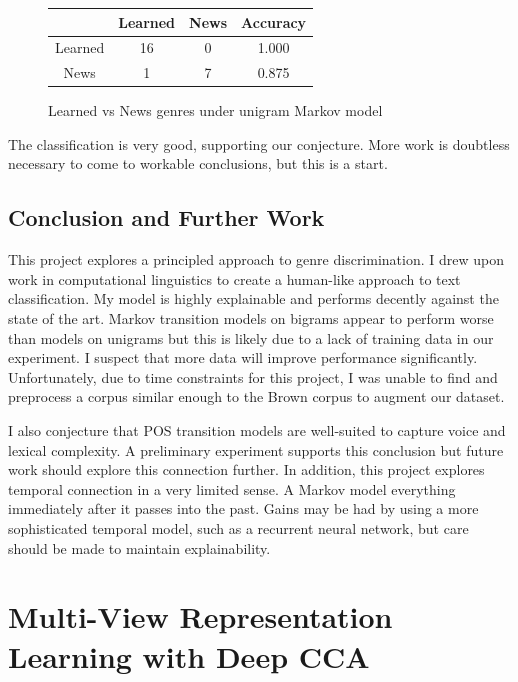 \documentclass[12pt, titlepage]{article}
\begin{document}
\begin{figure}[ht!]
\centering
\begin{tabular}{|c|c|c|c|}
\hline
 & Learned & News & Accuracy\\
\hline
Learned & 16 & 0 & 1.000\\
\hline
News & 1 & 7 & 0.875\\
\hline
\end{tabular}
\caption{Learned vs News genres under unigram Markov model}
\end{figure}
The classification is very good, supporting our conjecture. More work is doubtless necessary to come to workable conclusions, but this is a start.

\subsection{Conclusion and Further Work}
This project explores a principled approach to genre discrimination. I drew upon work in computational linguistics to create a human-like approach to text classification. My model is highly explainable and performs decently against the state of the art. Markov transition models on bigrams appear to perform worse than models on unigrams but this is likely due to a lack of training data in our experiment. I suspect that more data will improve performance significantly. Unfortunately, due to time constraints for this project, I was unable to find and preprocess a corpus similar enough to the Brown corpus to augment our dataset.

I also conjecture that POS transition models are well-suited to capture voice and lexical complexity. A preliminary experiment supports this conclusion but future work should explore this connection further. In addition, this project explores temporal connection in a very limited sense. A Markov model  everything immediately after it passes into the past. Gains may be had by using a more sophisticated temporal model, such as a recurrent neural network, but care should be made to maintain explainability.



\section{Multi-View Representation Learning with Deep CCA}
\end{document}
